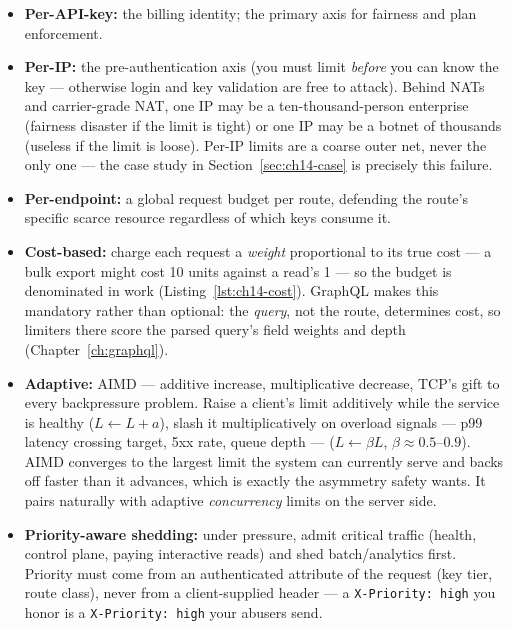 \begin{itemize}
  \item \textbf{Per-API-key:} the billing identity; the primary axis for
        fairness and plan enforcement.
  \item \textbf{Per-IP:} the pre-authentication axis (you must limit
        \emph{before} you can know the key --- otherwise login and key
        validation are free to attack). Behind NATs and carrier-grade NAT,
        one IP may be a ten-thousand-person enterprise (fairness disaster
        if the limit is tight) or one IP may be a botnet of thousands
        (useless if the limit is loose). Per-IP limits are a coarse outer
        net, never the only one --- the case study in
        Section~\ref{sec:ch14-case} is precisely this failure.
  \item \textbf{Per-endpoint:} a global request budget per route, defending
        the route's specific scarce resource regardless of which keys
        consume it.
  \item \textbf{Cost-based:} charge each request a \emph{weight}
        proportional to its true cost --- a bulk export might cost 10 units
        against a read's 1 --- so the budget is denominated in work
        (Listing~\ref{lst:ch14-cost}). GraphQL makes this mandatory rather
        than optional: the \emph{query}, not the route, determines cost, so
        limiters there score the parsed query's field weights and depth
        (Chapter~\ref{ch:graphql}).
  \item \textbf{Adaptive:} AIMD --- additive increase, multiplicative
        decrease, TCP's gift to every backpressure problem. Raise a client's
        limit additively while the service is healthy ($L \leftarrow L + a$),
        slash it multiplicatively on overload signals --- p99 latency
        crossing target, 5xx rate, queue depth --- ($L \leftarrow \beta L$,
        $\beta \approx 0.5$--$0.9$). AIMD converges to the largest limit the
        system can currently serve and backs off faster than it advances,
        which is exactly the asymmetry safety wants. It pairs naturally with
        adaptive \emph{concurrency} limits on the server side.
  \item \textbf{Priority-aware shedding:} under pressure, admit critical
        traffic (health, control plane, paying interactive reads) and shed
        batch/analytics first. Priority must come from an authenticated
        attribute of the request (key tier, route class), never from a
        client-supplied header --- a \texttt{X-Priority: high} you honor is
        a \texttt{X-Priority: high} your abusers send.
\end{itemize}

